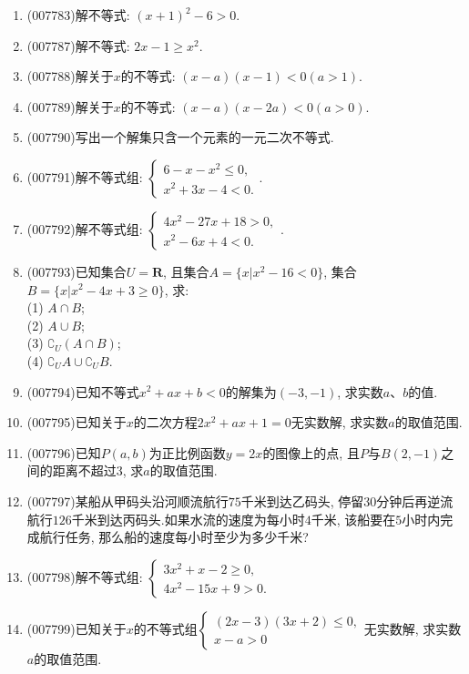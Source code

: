 \documentclass[10pt,a4paper]{article}
\begin{document}
\begin{enumerate}[1.]

\item {\tiny (007783)}解不等式: $(x+1)^2-6>0$.
\item {\tiny (007787)}解不等式: $2x-1\ge x^2$.
\item {\tiny (007788)}解关于$x$的不等式: $(x-a)(x-1)<0(a>1)$.
\item {\tiny (007789)}解关于$x$的不等式: $(x-a)(x-2a)<0(a>0)$.
\item {\tiny (007790)}写出一个解集只含一个元素的一元二次不等式.
\item {\tiny (007791)}解不等式组: $\begin{cases} 6-x-x^2\le 0, \\ x^2+3x-4<0. \end{cases}$.
\item {\tiny (007792)}解不等式组: $\begin{cases} 4x^2-27x+18>0, \\ x^2-6x+4<0. \end{cases}$.
\item {\tiny (007793)}已知集合$U=\mathbf{R}$, 且集合$A=\{x|x^2-16<0\}$, 集合$B=\{x|x^2-4x+3\ge 0\}$, 求:\\
(1) $A\cap B$;\\
(2) $A\cup B$;\\
(3) $\complement _U(A\cap B)$;\\
(4) $\complement _UA\cup \complement _UB$.
\item {\tiny (007794)}已知不等式$x^2+ax+b<0$的解集为$(-3,-1)$, 求实数$a$、$b$的值.
\item {\tiny (007795)}已知关于$x$的二次方程$2x^2+ax+1=0$无实数解, 求实数$a$的取值范围.
\item {\tiny (007796)}已知$P(a,b)$为正比例函数$y=2x$的图像上的点, 且$P$与$B(2,-1)$之间的距离不超过$3$, 求$a$的取值范围.
\item {\tiny (007797)}某船从甲码头沿河顺流航行$75$千米到达乙码头, 停留$30$分钟后再逆流航行$126$千米到达丙码头.如果水流的速度为每小时$4$千米, 该船要在$5$小时内完成航行任务, 那么船的速度每小时至少为多少千米?
\item {\tiny (007798)}解不等式组: $\begin{cases} 3x^2+x-2\ge 0, \\ 4x^2-15x+9>0. \end{cases}$
\item {\tiny (007799)}已知关于$x$的不等式组$\begin{cases} (2x-3)(3x+2)\le 0, \\ x-a>0 \end{cases}$无实数解, 求实数$a$的取值范围.

\end{enumerate}
\end{document}
